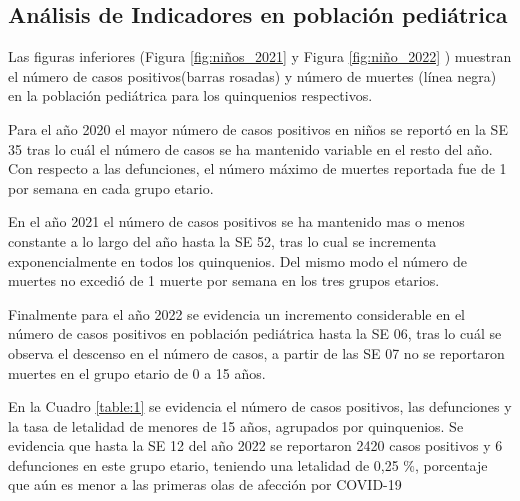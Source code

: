 \documentclass[12pt,a4paper,openany]{book}
\begin{document}
\subsection*{Análisis de Indicadores en población pediátrica}
\noindent Las figuras inferiores (Figura \ref{fig:niños_2021} y Figura \ref{fig:niño_2022} ) muestran el número de casos positivos(barras rosadas) y número de muertes (línea negra) en la población pediátrica para los quinquenios respectivos.

Para el año 2020 el mayor número de casos positivos en niños se reportó en la SE 35 tras lo cuál el número de casos se ha mantenido variable en el resto del año. Con respecto a las defunciones,  el número máximo de muertes reportada fue de 1 por semana en cada grupo etario. 

En el año 2021 el número de casos positivos se ha mantenido mas o menos constante a lo largo del año hasta la SE 52, tras lo cual se incrementa exponencialmente en todos los quinquenios. Del mismo modo el número de muertes no excedió de 1 muerte por semana en los tres grupos etarios.  

Finalmente para el año 2022 se evidencia un incremento considerable en 
el número de casos positivos en población pediátrica hasta la SE 06, tras lo cuál se observa el descenso en el número de casos, a partir de las SE 07 no se reportaron muertes en el grupo etario de 0 a 15 años.  


En la Cuadro \ref{table:1} se evidencia el número de casos positivos, las defunciones y la tasa de letalidad de menores de 15 años, agrupados por quinquenios. Se evidencia que hasta la SE 12 del año 2022 se reportaron 2420 casos positivos y 6 defunciones en este grupo etario, teniendo una letalidad de 0,25 $\%$, porcentaje que aún es menor a las primeras olas de afección por COVID-19  
\end{document}
